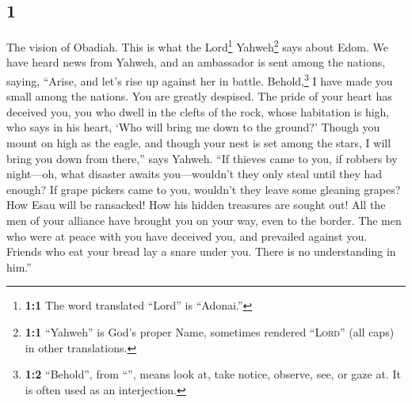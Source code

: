 \begin{paracol}{2}
\begin{otherlanguage}{english}
\hypertarget{section-1}{%
\section{1}\label{section-1}}

 The vision of Obadiah. This is what the Lord\footnote{\textbf{1:1}
  The word translated ``Lord'' is ``Adonai.''} Yahweh\footnote{\textbf{1:1}
  ``Yahweh'' is God's proper Name, sometimes rendered ``\textsc{Lord}''
  (all caps) in other translations.} says about Edom. We have heard news
from Yahweh, and an ambassador is sent among the nations, saying,
``Arise, and let's rise up against her in battle. 
Behold,\footnote{\textbf{1:2} ``Behold'', from ``'', means
  look at, take notice, observe, see, or gaze at. It is often used as an
  interjection.} I have made you small among the nations. You are
greatly despised.  The pride of your heart has deceived
you, you who dwell in the clefts of the rock, whose habitation is high,
who says in his heart, `Who will bring me down to the ground?'
 Though you mount on high as the eagle, and though your
nest is set among the stars, I will bring you down from there,'' says
Yahweh.  ``If thieves came to you, if robbers by
night---oh, what disaster awaits you---wouldn't they only steal until
they had enough? If grape pickers came to you, wouldn't they leave some
gleaning grapes?  How Esau will be ransacked! How his
hidden treasures are sought out!  All the men of your
alliance have brought you on your way, even to the border. The men who
were at peace with you have deceived you, and prevailed against you.
Friends who eat your bread lay a snare under you. There is no
understanding in him.''


\end{otherlanguage}
\end{paracol}
